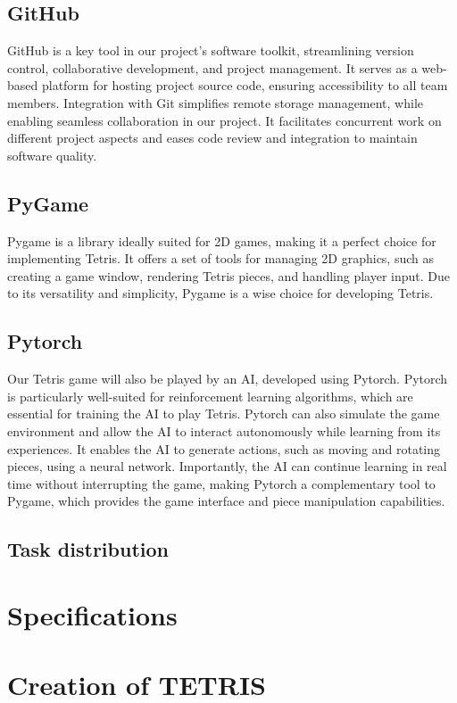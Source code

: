 \documentclass[conference]{IEEEtran}
\begin{document}
\subsection*{GitHub}
GitHub is a key tool in our project's software toolkit, streamlining version control, collaborative development, and project management. It serves as a web-based platform for hosting project source code, ensuring accessibility to all team members. Integration with Git simplifies remote storage management, while enabling seamless collaboration in our project. It facilitates concurrent work on different project aspects and eases code review and integration to maintain software quality.
\subsection*{PyGame}
Pygame\cite{b4} is a library ideally suited for 2D games, making it a perfect choice for implementing Tetris. It offers a set of tools for managing 2D graphics, such as creating a game window, rendering Tetris pieces, and handling player input. Due to its versatility and simplicity, Pygame is a wise choice for developing Tetris.
\subsection*{Pytorch}
Our Tetris game will also be played by an AI, developed using Pytorch\cite{b5}. Pytorch is particularly well-suited for reinforcement learning algorithms, which are essential for training the AI to play Tetris. Pytorch can also simulate the game environment and allow the AI to interact autonomously while learning from its experiences. It enables the AI to generate actions, such as moving and rotating pieces, using a neural network. Importantly, the AI can continue learning in real time without interrupting the game, making Pytorch a complementary tool to Pygame, which provides the game interface and piece manipulation capabilities.

\subsection{Task distribution}


\section{Specifications}

\section*{Creation of TETRIS}
\end{document}
